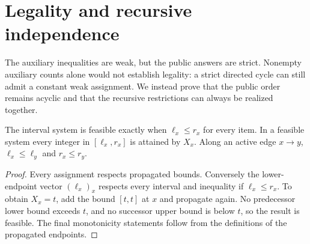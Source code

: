 \section{Legality and recursive independence}
\label{sec:legality}

The auxiliary inequalities are weak, but the public answers are strict.
Nonempty auxiliary counts alone would not establish legality: a strict
directed cycle can still admit a constant weak assignment. We instead prove
that the public order remains acyclic and that the recursive restrictions
can always be realized together.

\begin{lemma}
\label{lem:support}
The interval system is feasible exactly when $\ell_x\leq r_x$ for every item.
In a feasible system every integer in $[\ell_x,r_x]$ is attained by $X_x$.
Along an active edge $x\to y$, $\ell_x\leq\ell_y$ and $r_x\leq r_y$.
\end{lemma}
\begin{proof}
Every assignment respects propagated bounds. Conversely the lower-endpoint
vector $(\ell_x)_x$ respects every interval and inequality if
$\ell_x\leq r_x$. To obtain $X_x=t$, add the bound $[t,t]$ at $x$ and
propagate again. No predecessor lower bound exceeds $t$, and no successor
upper bound is below $t$, so the result is feasible. The final monotonicity
statements follow from the definitions of the propagated endpoints.
\end{proof}

